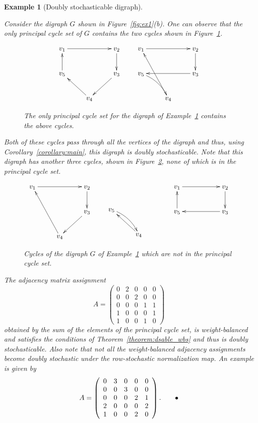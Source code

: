 \documentclass[final]{siamltex}
\newtheorem{example}[theorem]{Example}
\begin{document}
\begin{example}[Doubly stochasticable digraph]\label{ex:2}
  {\rm Consider the digraph $ G $ shown in Figure~\ref{fig:ex1}(b).
    One can observe that the only principal cycle set of $ G $
    contains the two cycles shown in Figure~\ref{fig:ex2_pc}.
  \begin{figure}
    \[
    \xymatrix{ v_1 \ar[rr] & & v_2 \ar[d] \\
      v_5 \ar[u]  & &v_3  \ar[dl]\\
      & v_4 \ar[ul] & } \qquad
      \xymatrix{ v_1 \ar[rr] & & v_2 \ar[d] \\
      v_5 \ar@/^/[dr] & &v_3 \ar[ll] \\
      & v_4 \ar[uul]& }
    \]
    \caption{The only principal cycle set for the digraph of
      Example~\ref{ex:2} contains the above cycles.}
    \label{fig:ex2_pc}
  \end{figure}
  Both of these cycles pass through all the vertices of the digraph
  and thus, using Corollary~\ref{corollary:main}, this digraph is
  doubly stochasticable. Note that this digraph has another three
  cycles, shown in Figure~\ref{fig:ex2_extra_cycles}, none of which is
  in the principal cycle set.
  \begin{figure}
    \[
    \xymatrix{ v_1 \ar[rr] & & v_2 \ar[d] \\
      & &v_3 \ar[dl]\\
      & v_4 \ar[uul]& }\qquad
      \xymatrix{
        \\
      v_5 \ar@/^/[dr] & &\\
      & v_4 \ar[ul] & }
    \quad
    \xymatrix{ v_1 \ar[rr] & & v_2 \ar[d] \\
      v_5 \ar[u] & &v_3 \ar[ll] }
    \]
    \caption{Cycles of the digraph $ G $ of Example~\ref{ex:2} which
      are not in the principal cycle set.}
    \label{fig:ex2_extra_cycles}
  \end{figure}
  The adjacency matrix assignment
  \[
  A=\left(\begin{array}{ccccc}
      0 & 2 & 0 &0 & 0\\
      0 & 0 & 2 & 0 & 0\\
      0 & 0 & 0 & 1 & 1\\
      1 & 0 & 0 & 0 & 1\\
      1 & 0 & 0 & 1 &0
    \end{array}\right)
  \]
  obtained by the sum of the elements of the principal cycle set, is
  weight-balanced and satisfies the conditions of
  Theorem~\ref{theorem:dsable_wbs} and thus is doubly stochasticable.
  Also note that not all the weight-balanced adjacency assignments
  become doubly stochastic under the row-stochastic normalization
  map. An example is given by
  \[
  A=\left(\begin{array}{ccccc}
      0 & 3 & 0 &0 & 0\\
      0 & 0 & 3 & 0 & 0\\
      0 & 0 & 0 & 2 & 1\\
      2 & 0 & 0 & 0 & 2\\
      1 & 0 & 0 & 2 &0
    \end{array}\right) .   {\tag*{$\bullet$}}
  \]
}
\end{example}
\smallskip
\end{document}
